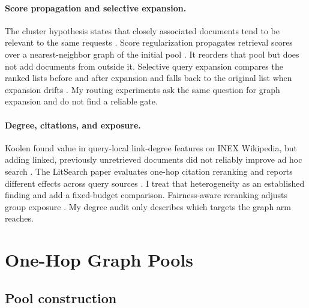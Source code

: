\documentclass[10pt,twocolumn]{article}
\begin{document}
\paragraph{Score propagation and selective expansion.}
The cluster hypothesis states that closely associated documents tend to be
relevant to the same requests \citep{voorhees1985cluster}. Score regularization
propagates retrieval scores over a nearest-neighbor graph of the initial pool
\citep{diaz2005regularizing}. It reorders that pool but does not add documents
from outside it. Selective query expansion compares the ranked lists before and
after expansion and falls back to the original list when expansion drifts
\citep{cronentownsend2004selective}. My routing experiments ask the same
question for graph expansion and do not find a reliable gate.

\paragraph{Degree, citations, and exposure.}
Koolen found value in query-local link-degree features on INEX Wikipedia, but
adding linked, previously unretrieved documents did not reliably improve ad hoc
search \citep{koolen2011meaning}. The LitSearch paper evaluates one-hop citation
reranking and reports different effects across query sources
\citep{ajith2024litsearch}. I treat that heterogeneity as an established
finding and add a fixed-budget comparison. Fairness-aware reranking adjusts
group exposure \citep{janich2024fairnessaware}. My degree audit only describes
which targets the graph arm reaches.

\section{One-Hop Graph Pools}

\subsection{Pool construction}
\end{document}

